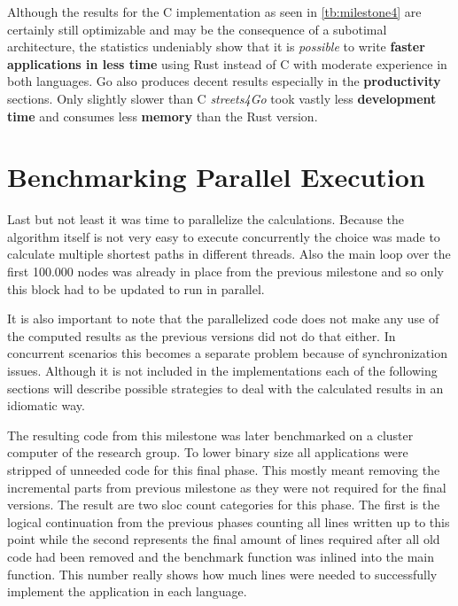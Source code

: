 Although the results for the C implementation as seen in \autoref{tb:milestone4} are certainly still optimizable and may be the consequence of a subotimal architecture, the statistics undeniably show that it is \textit{possible} to write \textbf{faster applications in less time} using Rust instead of C with moderate experience in both languages. Go also produces decent results especially in the \textbf{productivity} sections. Only slightly slower than C \textit{streets4Go} took vastly less \textbf{development time} and consumes less \textbf{memory} than the Rust version.

\section{Benchmarking Parallel Execution}
\label{sec:Implementation::ParallelBenchmark}

Last but not least it was time to parallelize the calculations. Because the algorithm itself is not very easy to execute concurrently the choice was made to calculate multiple shortest paths in different threads. Also the main loop over the first 100.000 nodes was already in place from the previous milestone and so only this block had to be updated to run in parallel.

It is also important to note that the parallelized code does not make any use of the computed results as the previous versions did not do that either. In concurrent scenarios this becomes a separate problem because of synchronization issues. Although it is not included in the implementations each of the following sections will describe possible strategies to deal with the calculated results in an idiomatic way.

The resulting code from this milestone was later benchmarked on a cluster computer of the research group. To lower binary size all applications were stripped of unneeded code for this final phase. This mostly meant removing the incremental parts from previous milestone as they were not required for the final versions. The result are two \gls{sloc} count categories for this phase. The first is the logical continuation from the previous phases counting all lines written up to this point while the second represents the final amount of lines required after all old code had been removed and the benchmark function was inlined into the main function. This number really shows how much lines were needed to successfully implement the application in each language.


